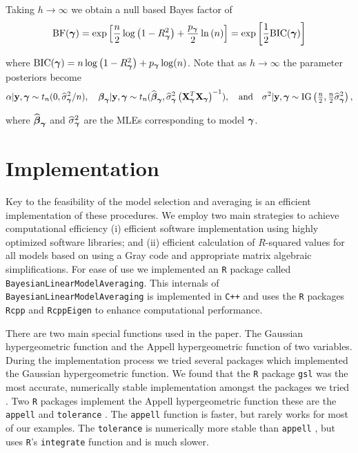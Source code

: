 \noindent Taking $h\to\infty$ we obtain a null based Bayes factor of
$$
\displaystyle \mbox{BF}({\boldsymbol \gamma})
=
\exp\left[
\frac{n}{2}\log\left( 1 - R_{\boldsymbol \gamma}^2 \right) 
+ \frac{p_{\boldsymbol \gamma}}{2}\ln\left(n \right)
\right] = \exp\left[ \frac{1}{2}\mbox{BIC}({\boldsymbol \gamma})\right]
$$

\noindent where $\mbox{BIC}({\boldsymbol \gamma}) = n\log\left( 1 - R_{\boldsymbol \gamma}^2 \right) + p_{\boldsymbol \gamma} \log(n)$. Note that as $h\to\infty$ the parameter posteriors become
$$\alpha|{\bf y},{\boldsymbol \gamma} \sim t_n(0,\widehat{\sigma}_{{\boldsymbol \gamma}}^2/n), \quad
{\boldsymbol\beta}_{{\boldsymbol \gamma}}|{\bf y},{\boldsymbol \gamma} \sim t_n( \widehat{{\boldsymbol \beta}}_{{\boldsymbol \gamma}}, \widehat{\sigma}_{{\boldsymbol \gamma}}^2 \left({\bf X}_{\boldsymbol \gamma}^T{\bf X}_{\boldsymbol \gamma}  \right)^{-1} ),
\quad \mbox{and} \quad  
\sigma^2|{\bf y},{\boldsymbol \gamma} \sim \mbox{IG}\left( \tfrac{n}{2}, \tfrac{n}{2}\widehat{\sigma}_{{\boldsymbol \gamma}}^2 \right),
$$

\noindent 
where $\widehat{{\boldsymbol \beta}}_{{\boldsymbol \gamma}}$
and $\widehat{\sigma}_{{\boldsymbol \gamma}}^2$ are the
MLEs corresponding to model ${\boldsymbol \gamma}$.

 
\section{Implementation}
\label{sec:implementation}

Key to the feasibility of the model selection and averaging is an efficient implementation of these procedures. We employ two main 
strategies to achieve computational efficiency (i) efficient software implementation using
highly optimized software libraries; and (ii) efficient calculation of
$R$-squared values for all models based on using a Gray code and appropriate
matrix algebraic simplifications.
For ease of use we 
implemented an {\tt R} package called {\tt BayesianLinearModelAveraging}.
This internals of {\tt BayesianLinearModelAveraging} is implemented
in {\tt C++} and uses the {\tt R} packages \texttt{Rcpp} and \texttt{RcppEigen} to enhance
computational performance.  

There are two main special functions used in the paper. The 
Gaussian hypergeometric function and the Appell hypergeometric function
of two variables. During the 
implementation process we tried several packages which implemented the
Gaussian hypergeometric function.
We found that the {\tt R} package {\tt gsl} was the most accurate, numerically
stable implementation amongst the packages we tried
\citep{Hankin2006}. Two {\tt R} packages 
implement the Appell
hypergeometric function these are the
{\tt appell} \citep{Bove2013}
and {\tt tolerance} \citep{Young2010}. The 
{\tt appell} function is faster, but rarely works for most of our examples.
The {\tt tolerance} is numerically more stable than {\tt appell} , but uses {\tt R}'s {\tt integrate}
function and is much slower.


